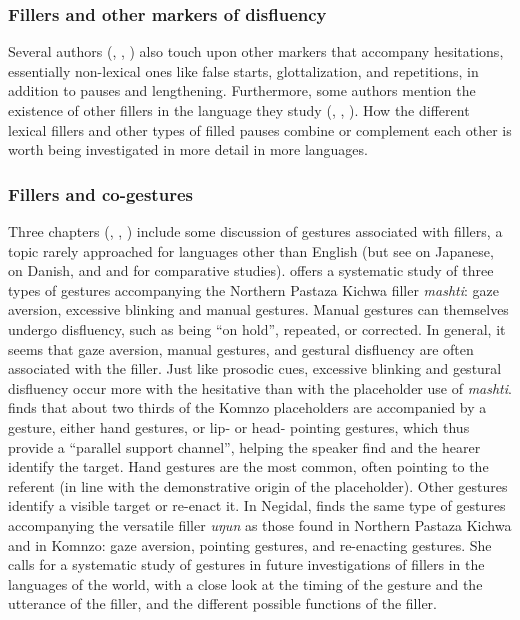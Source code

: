 \documentclass[output=paper]{langscibook}
\begin{document}
\subsubsection{Fillers and other markers of disfluency}\label{sec:intro:9.3.2}
Several authors (\citeauthor{chapters/mcdonnell_billings}, \citeauthor{chapters/doehler}, \citeauthor{chapters/rice}) also touch upon other markers that accompany hesitations, essentially non-lexical ones like false starts, glottalization, and repetitions, in addition to pauses and lengthening. Furthermore, some authors mention the existence of other fillers in the language they study (\citeauthor{chapters/visser}, \citeauthor{chapters/doehler}, \citeauthor{chapters/rice}). How the different lexical fillers and other types of filled pauses combine or complement each other is worth being investigated in more detail in more languages.

\subsubsection{Fillers and co-gestures}\label{sec:intro:9.3.3}
Three chapters (\citeauthor{chapters/pakendorf}, \citeauthor{chapters/doehler}, \citeauthor{chapters/rice}) include some discussion of gestures associated with fillers, a topic rarely approached for languages other than English (but see \citealt{Hayashi2003body} on Japanese, \citealt{Navaretta2015} on Danish, and \citealt{Graziano2018} and \citealt{Kosmala2024} for comparative studies). \citeauthor{chapters/rice} offers a systematic study of three types of gestures accompanying the Northern Pastaza Kichwa filler \textit{mashti}: gaze aversion, excessive blinking and manual gestures. Manual gestures can themselves undergo disfluency, such as being “on hold”, repeated, or corrected. In general, it seems that gaze aversion, manual gestures, and gestural disfluency are often associated with the filler. Just like prosodic cues, excessive blinking and gestural disfluency occur more with the hesitative than with the placeholder use of \textit{mashti}. \citeauthor{chapters/doehler} finds that about two thirds of the Komnzo placeholders are accompanied by a gesture, either hand gestures, or lip- or head- pointing gestures, which thus provide a “parallel support channel”, helping the speaker find and the hearer identify the target. Hand gestures are the most common, often pointing to the referent (in line with the demonstrative origin of the placeholder). Other gestures identify a visible target or re-enact it. In Negidal, \citeauthor{chapters/pakendorf} finds the same type of gestures accompanying the versatile filler \textit{uŋun} as those found in Northern Pastaza Kichwa and in Komnzo: gaze aversion, pointing gestures, and re-enacting gestures. She calls for a systematic study of gestures in future investigations of fillers in the languages of the world, with a close look at the timing of the gesture and the utterance of the filler, and the different possible functions of the filler.
\end{document}
